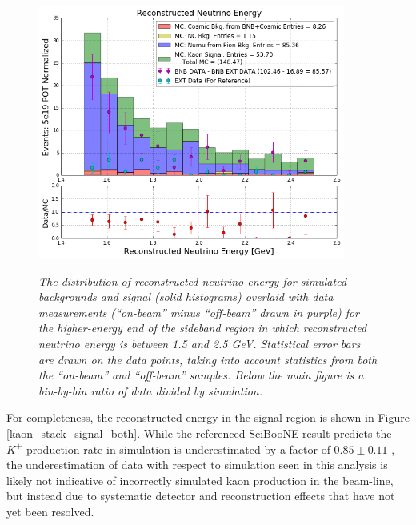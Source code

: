 \begin{figure}[ht!]
\centering
	\includegraphics[width=0.9\textwidth]{Figures/kaon_both_highsideband.png} \\
\caption{\textit{The distribution of reconstructed neutrino energy for simulated backgrounds and signal (solid histograms) overlaid with data measurements (``on-beam'' minus ``off-beam'' drawn in purple) for the higher-energy end of the sideband region in which reconstructed neutrino energy is between 1.5 and 2.5 GeV. Statistical error bars are drawn on the data points, taking into account statistics from both the ``on-beam'' and ``off-beam'' samples. Below the main figure is a bin-by-bin ratio of data divided by simulation.}}\label{kaon_stack_highsideband_both}
\end{figure}


For completeness, the reconstructed energy in the signal region is shown in Figure \ref{kaon_stack_signal_both}. While the referenced SciBooNE result predicts the $K^+$ production rate in simulation is underestimated by a factor of $0.85\pm0.11$ \cite{gary_kaon_production_paper}, the underestimation of data with respect to simulation seen in this analysis is likely not indicative of incorrectly simulated kaon production in the beam-line, but instead due to systematic detector and reconstruction effects that have not yet been resolved. %


